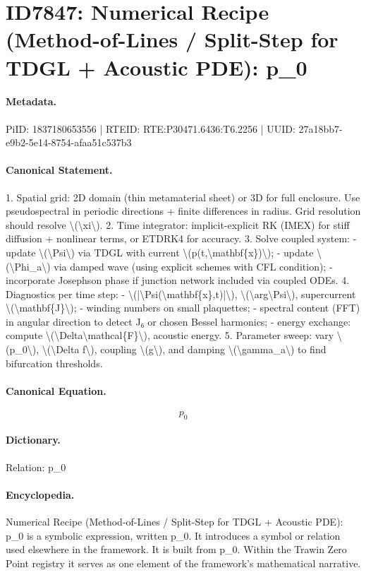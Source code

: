 \section*{ID7847: Numerical Recipe (Method-of-Lines / Split-Step for TDGL + Acoustic PDE): p\_0}
\paragraph{Metadata.}
PiID: 1837180653556 | RTEID: RTE:P30471.6436:T6.2256 | UUID: 27a18bb7-e9b2-5e14-8754-afaa51c537b3

\paragraph{Canonical Statement.}
1. Spatial grid: 2D domain (thin metamaterial sheet) or 3D for full enclosure. Use pseudospectral in periodic directions + finite differences in radius. Grid resolution should resolve \textbackslash{}(\textbackslash{}xi\textbackslash{}). 2. Time integrator: implicit-explicit RK (IMEX) for stiff diffusion + nonlinear terms, or ETDRK4 for accuracy. 3. Solve coupled system: - update \textbackslash{}(\textbackslash{}Psi\textbackslash{}) via TDGL with current \textbackslash{}(p(t,\textbackslash{}mathbf\{x\})\textbackslash{}); - update \textbackslash{}(\textbackslash{}Phi\_a\textbackslash{}) via damped wave (using explicit schemes with CFL condition); - incorporate Josephson phase if junction network included via coupled ODEs. 4. Diagnostics per time step: - \textbackslash{}(|\textbackslash{}Psi(\textbackslash{}mathbf\{x\},t)|\textbackslash{}), \textbackslash{}(\textbackslash{}arg\textbackslash{}Psi\textbackslash{}), supercurrent \textbackslash{}(\textbackslash{}mathbf\{J\}\textbackslash{}); - winding numbers on small plaquettes; - spectral content (FFT) in angular direction to detect J₆ or chosen Bessel harmonics; - energy exchange: compute \textbackslash{}(\textbackslash{}Delta\textbackslash{}mathcal\{F\}\textbackslash{}), acoustic energy. 5. Parameter sweep: vary \textbackslash{}(p\_0\textbackslash{}), \textbackslash{}(\textbackslash{}Delta f\textbackslash{}), coupling \textbackslash{}(g\textbackslash{}), and damping \textbackslash{}(\textbackslash{}gamma\_a\textbackslash{}) to find bifurcation thresholds.

\paragraph{Canonical Equation.}
\[
p_0
\]

\paragraph{Dictionary.}
Relation: p\_0

\paragraph{Encyclopedia.}
Numerical Recipe (Method-of-Lines / Split-Step for TDGL + Acoustic PDE): p\_0 is a symbolic expression, written p\_0. It introduces a symbol or relation used elsewhere in the framework. It is built from p\_0. Within the Trawin Zero Point registry it serves as one element of the framework's mathematical narrative.
